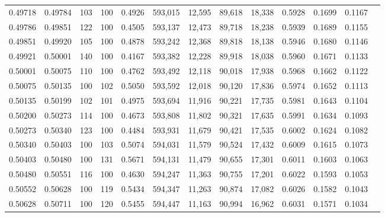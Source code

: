 \begin{tabular}{rrrrrrrrrrrrr}
0.49718 & 0.49784 &   103 & 100 &                                     0.4926 & 593,015 &  12,595 &  89,618 &  18,338 & 0.5928 & 0.1699 & 0.1167 \\
0.49786 & 0.49851 &   122 & 100 &                                     0.4505 & 593,137 &  12,473 &  89,718 &  18,238 & 0.5939 & 0.1689 & 0.1155 \\
0.49851 & 0.49920 &   105 & 100 &                                     0.4878 & 593,242 &  12,368 &  89,818 &  18,138 & 0.5946 & 0.1680 & 0.1146 \\
0.49921 & 0.50001 &   140 & 100 &                                     0.4167 & 593,382 &  12,228 &  89,918 &  18,038 & 0.5960 & 0.1671 & 0.1133 \\
0.50001 & 0.50075 &   110 & 100 &                                     0.4762 & 593,492 &  12,118 &  90,018 &  17,938 & 0.5968 & 0.1662 & 0.1122 \\
0.50075 & 0.50135 &   100 & 102 &                                     0.5050 & 593,592 &  12,018 &  90,120 &  17,836 & 0.5974 & 0.1652 & 0.1113 \\
0.50135 & 0.50199 &   102 & 101 &                                     0.4975 & 593,694 &  11,916 &  90,221 &  17,735 & 0.5981 & 0.1643 & 0.1104 \\
0.50200 & 0.50273 &   114 & 100 &                                     0.4673 & 593,808 &  11,802 &  90,321 &  17,635 & 0.5991 & 0.1634 & 0.1093 \\
0.50273 & 0.50340 &   123 & 100 &                                     0.4484 & 593,931 &  11,679 &  90,421 &  17,535 & 0.6002 & 0.1624 & 0.1082 \\
0.50340 & 0.50403 &   100 & 103 &                                     0.5074 & 594,031 &  11,579 &  90,524 &  17,432 & 0.6009 & 0.1615 & 0.1073 \\
0.50403 & 0.50480 &   100 & 131 &                                     0.5671 & 594,131 &  11,479 &  90,655 &  17,301 & 0.6011 & 0.1603 & 0.1063 \\
0.50480 & 0.50551 &   116 & 100 &                                     0.4630 & 594,247 &  11,363 &  90,755 &  17,201 & 0.6022 & 0.1593 & 0.1053 \\
0.50552 & 0.50628 &   100 & 119 &                                     0.5434 & 594,347 &  11,263 &  90,874 &  17,082 & 0.6026 & 0.1582 & 0.1043 \\
0.50628 & 0.50711 &   100 & 120 &                                     0.5455 & 594,447 &  11,163 &  90,994 &  16,962 & 0.6031 & 0.1571 & 0.1034 \\

\end{tabular}

